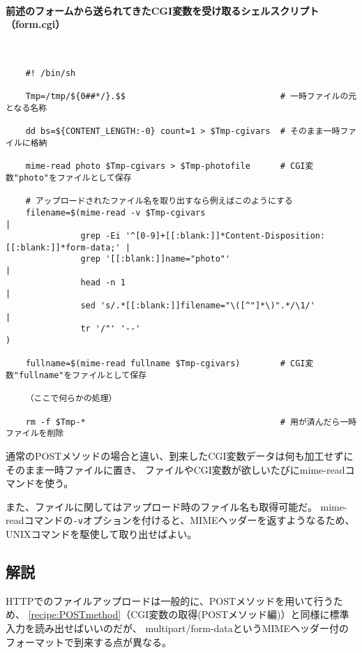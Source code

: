 \paragraph{前述のフォームから送られてきたCGI変数を受け取るシェルスクリプト（form.cgi）} 　\\
\begin{frameboxit}{160.0mm}
\begin{verbatim}
	#! /bin/sh
	
	Tmp=/tmp/${0##*/}.$$                               # 一時ファイルの元となる名称
	
	dd bs=${CONTENT_LENGTH:-0} count=1 > $Tmp-cgivars  # そのまま一時ファイルに格納
	
	mime-read photo $Tmp-cgivars > $Tmp-photofile      # CGI変数"photo"をファイルとして保存

	# アップロードされたファイル名を取り出すなら例えばこのようにする
	filename=$(mime-read -v $Tmp-cgivars                                                |
	           grep -Ei '^[0-9]+[[:blank:]]*Content-Disposition:[[:blank:]]*form-data;' |
	           grep '[[:blank:]]name="photo"'                                           |
	           head -n 1                                                                |
	           sed 's/.*[[:blank:]]filename="\([^"]*\)".*/\1/'                          |
	           tr '/"' '--'                                                             )

	fullname=$(mime-read fullname $Tmp-cgivars)        # CGI変数"fullname"をファイルとして保存

	（ここで何らかの処理）
	
	rm -f $Tmp-*                                       # 用が済んだら一時ファイルを削除
\end{verbatim}
\end{frameboxit}

通常のPOSTメソッドの場合と違い、到来したCGI変数データは何も加工せずにそのまま一時ファイルに置き、
ファイルやCGI変数が欲しいたびにmime-readコマンドを使う。

また、ファイルに関してはアップロード時のファイル名も取得可能だ。
mime-readコマンドの\verb|-v|オプションを付けると、MIMEヘッダーを返すようなるため、
UNIXコマンドを駆使して取り出せばよい。

\subsection*{解説}

HTTPでのファイルアップロードは一般的に、POSTメソッドを用いて行うため、
\ref{recipe:POSTmethod}（CGI変数の取得(POSTメソッド編)）と同様に標準入力を読み出せばいいのだが、
multipart/form-dataというMIMEヘッダー付のフォーマットで到来する点が異なる。

